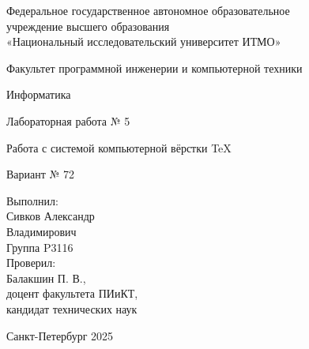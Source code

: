 {\fontsize{16}{24}\selectfont

\begin{titlepage}
    \centering
    
    Федеральное государственное автономное образовательное\\
    учреждение высшего образования\\
    
    «Национальный исследовательский университет ИТМО»
    
    \vspace{\baselineskip}
    
    Факультет программной инженерии и компьютерной техники
    
    \vspace{3\baselineskip}
    
    Информатика
    
    Лабораторная работа № 5
    
    Работа с системой компьютерной вёрстки \TeX
    
    Вариант № 72
    
    \vspace{5\baselineskip}
    
    \noindent\hfill
        \begin{minipage}{0.45\textwidth}
            \centering
            Выполнил:\\
            Сивков Александр\\
            Владимирович\\
            Группа P3116\\
            Проверил:\\
            Балакшин П. В.,\\
            доцент факультета ПИиКТ,\\
            кандидат технических наук\\
        \end{minipage}
    
    \vfill
    
    Санкт-Петербург 2025
\end{titlepage}
}
